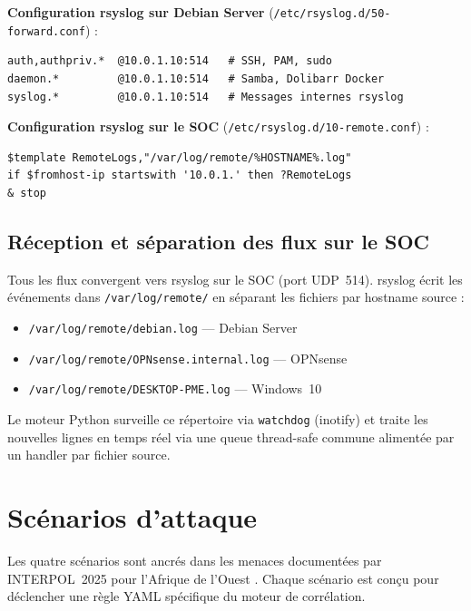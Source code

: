 \documentclass[12pt,a4paper]{article}
\begin{document}
\textbf{Configuration rsyslog sur Debian Server}
(\texttt{/etc/rsyslog.d/50-forward.conf}) :

\begin{lstlisting}
auth,authpriv.*  @10.0.1.10:514   # SSH, PAM, sudo
daemon.*         @10.0.1.10:514   # Samba, Dolibarr Docker
syslog.*         @10.0.1.10:514   # Messages internes rsyslog
\end{lstlisting}

\textbf{Configuration rsyslog sur le SOC}
(\texttt{/etc/rsyslog.d/10-remote.conf}) :

\begin{lstlisting}
$template RemoteLogs,"/var/log/remote/%HOSTNAME%.log"
if $fromhost-ip startswith '10.0.1.' then ?RemoteLogs
& stop
\end{lstlisting}

\subsection{Réception et séparation des flux sur le SOC}

Tous les flux convergent vers rsyslog sur le SOC (port UDP~514). rsyslog
écrit les événements dans \texttt{/var/log/remote/} en séparant les
fichiers par hostname source :

\begin{itemize}
    \item \texttt{/var/log/remote/debian.log} --- Debian Server
    \item \texttt{/var/log/remote/OPNsense.internal.log} --- OPNsense
    \item \texttt{/var/log/remote/DESKTOP-PME.log} --- Windows~10
\end{itemize}

Le moteur Python surveille ce répertoire via \texttt{watchdog} (inotify)
et traite les nouvelles lignes en temps réel via une queue thread-safe
commune alimentée par un handler par fichier source.

\section{Scénarios d'attaque}

Les quatre scénarios sont ancrés dans les menaces documentées par
INTERPOL~2025 pour l'Afrique de l'Ouest \cite{interpol2025}.
Chaque scénario est conçu pour déclencher une règle YAML spécifique
du moteur de corrélation.
\end{document}
